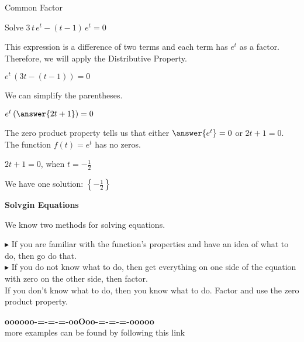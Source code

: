 \documentclass{ximera}
\begin{document}
\begin{example} Common Factor


Solve $3 \, t \, e^t - (t-1) \, e^t = 0$

\begin{explanation}



This expression is a difference of two terms and each term has $e^t$ as a factor.  Therefore, we will apply the Distributive Property.



$e^t \, (3t - (t-1))= 0$


We can simplify the parentheses.



$e^t \left( \answer{2t + 1} \right)= 0$



The zero product property tells us that either $\answer{e^t} = 0$ or $2t + 1 = 0$.  \\

The function $f(t) = e^t$ has no zeros. 


$2t + 1 = 0$, when $t = -\frac{1}{2}$

We have one solution: $\left\{ -\frac{1}{2} \right\}$

\end{explanation}
\end{example}







\begin{procedure} \textbf{\textcolor{red!70!black}{Solvgin Equations}}


We know two methods for solving equations.


\textbf{\textcolor{blue!55!black}{$\blacktriangleright$}} If you are familiar with the function's properties and have an idea of what to do, then go do that. \\


\textbf{\textcolor{blue!55!black}{$\blacktriangleright$}} If you do not know what to do, then get everything on one side of the equation with zero on the other side, then factor. \\



If you don't know what to do, then you know what to do.  Factor and use the zero product property.


\end{procedure}







\begin{center}
\textbf{\textcolor{green!50!black}{oooooo-=-=-=-ooOoo-=-=-=-ooooo}} \\

more examples can be found by following this link\\ 

\end{center}
\end{document}
